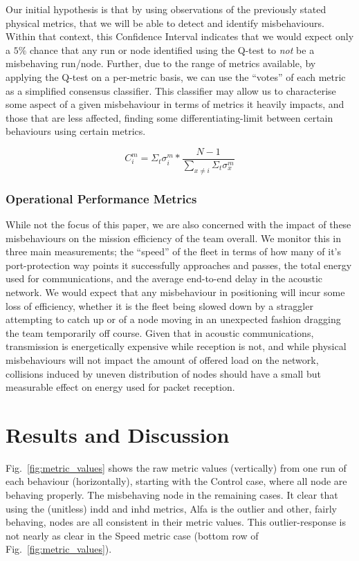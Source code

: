 Our initial hypothesis is that by using observations of the previously stated physical metrics, that we will be able to detect and identify misbehaviours.
Within that context, this Confidence Interval indicates that we would expect only a $5\%$ chance that any run or node identified using the Q-test to \emph{not} be a misbehaving run/node.
Further, due to the range of metrics available, by applying the Q-test on a per-metric basis, we can use the ``votes'' of each metric as a simplified consensus classifier.
This classifier may allow us to characterise some aspect of a given misbehaviour in terms of metrics it heavily impacts, and those that are less affected, finding some differentiating-limit between certain behaviours using certain metrics.

\begin{equation}
  C_{i}^{m} = \Sigma_t\sigma_{i}^m * \frac{N-1}{\sum_{x\neq i}{\Sigma_t\sigma_{x}^m}}\label{eq:confidence}
\end{equation}

\subsubsection{Operational Performance Metrics}
While not the focus of this paper, we are also concerned with the impact of these misbehaviours on the mission efficiency of the team overall.
We monitor this in three main measurements; the ``speed'' of the fleet in terms of how many of it's port-protection way points it successfully approaches and passes, the total energy used for communications, and the average end-to-end delay in the acoustic network.
We would expect that any misbehaviour in positioning will incur some loss of efficiency, whether it is the fleet being slowed down by a straggler attempting to catch up or of a node moving in an unexpected fashion dragging the team temporarily off course.
Given that in acoustic communications, transmission is energetically expensive while reception is not, and while physical misbehaviours will not impact the amount of offered load on the network, collisions induced by uneven distribution of nodes should have a small but measurable effect on energy used for packet reception.

\section{Results and Discussion}
Fig.~\ref{fig:metric_values} shows the raw metric values (vertically) from one run of each behaviour (horizontally), starting with the Control case, where all node are behaving properly.
The misbehaving node in the remaining cases.
It clear that using the (unitless) \gls{indd} and \gls{inhd} metrics, Alfa is the outlier and other, fairly behaving, nodes are all consistent in their metric values.
This outlier-response is not nearly as clear in the Speed metric case (bottom row of Fig.~\ref{fig:metric_values}).

